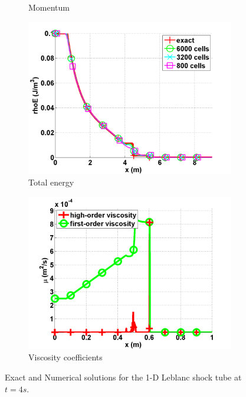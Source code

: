 \begin{figure}[H]
\begin{subfigure}[b]{0.495\textwidth}
                \caption{Momentum}
                \label{fig:1d_leblanc_density}
        \end{subfigure}
        \begin{subfigure}[b]{0.495\textwidth}
                \centering
                \includegraphics[width=\textwidth]{figures/Leblanc_exact_and_numerical_stt_total_energy_6000.png}
                \caption{Total energy}
                \label{fig:1d_leblanc_press}
        \end{subfigure}
        \begin{subfigure}[b]{0.495\textwidth}
                \centering
                \includegraphics[width=\textwidth]{figures/Leblanc_viscosity_numerical_6000.png}
                \caption{Viscosity coefficients}
                \label{fig:1d_leblanc_visc}
        \end{subfigure}
        \caption{Exact and Numerical solutions for the 1-D Leblanc shock tube at $t=4 s$.}\label{fig:1d_leblanc}
\end{figure}
